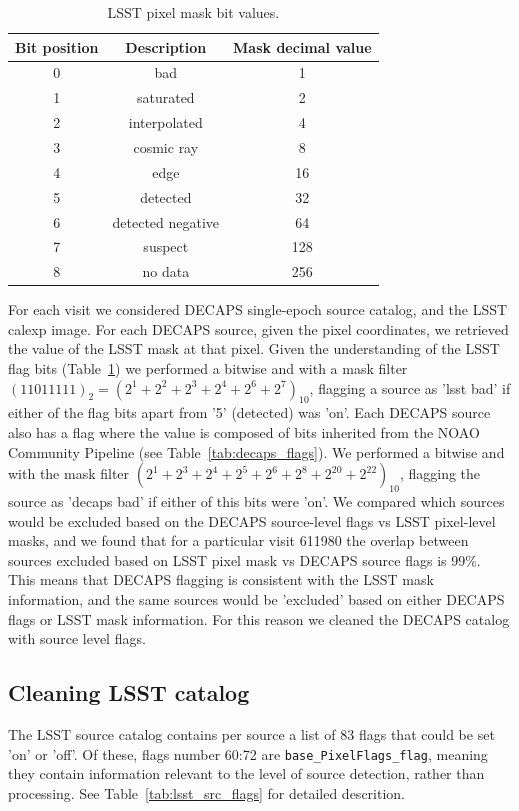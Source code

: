 \documentclass[DM,lsstdraft,toc,usenatbib]{lsstdoc}
\begin{document}
\begin{table}
\centering
\caption{LSST pixel mask bit values.}
\label{tab:lsst_flags}
\begin{tabular}{ ccc} 
\hline
Bit position & Description & Mask decimal value  \\ 
\hline
0  & bad               & 1    \\ 
1  & saturated         & 2   \\ 
2  & interpolated      & 4    \\ 
3  & cosmic ray        & 8    \\ 
4  & edge              & 16    \\ 
5  & detected          & 32   \\ 
6  & detected negative & 64   \\ 
7  & suspect           & 128   \\ 
8  & no data           & 256     \\ 
\hline
\end{tabular}
\end{table}

For each  visit we considered DECAPS single-epoch source catalog, and the LSST calexp image.  For each DECAPS source, given the pixel coordinates, we retrieved the value of the LSST mask at that pixel. Given the understanding of the LSST flag bits (Table~\ref{tab:lsst_flags})  we performed a bitwise and with a mask filter$(11011111)_{2} = (2^{1}+2^{2}+2^{3}+2^{4}+2^{6}+2^{7})_{10}$, flagging a source as 'lsst bad' if either of the flag bits apart from '5' (detected) was 'on'. 
Each DECAPS source  also has a flag where the value is composed of bits inherited from the NOAO Community Pipeline (see Table~\ref{tab:decaps_flags}). We performed a bitwise and with the mask filter $(2^{1}+ 2^{3}+  2^{4}+  2^{5}+  2^{6}+  2^{8}+  2^{20}+  2^{22})_{10}$, flagging the source as 'decaps bad' if either of this bits were 'on'. We compared which sources would be excluded based on the DECAPS source-level flags vs LSST pixel-level masks, and we found that for a particular visit 611980 the overlap between sources excluded based on LSST pixel mask vs DECAPS source flags is 99\%. This means that DECAPS flagging is consistent with the LSST mask information, and the same sources would be 'excluded' based on either DECAPS flags or LSST mask information. 
For this reason we cleaned the DECAPS catalog with  source level flags. 
 
\subsection{Cleaning LSST catalog}
\label{sec:clean_lsst}
The LSST source catalog contains per source a list of 83 flags that could be set 'on' or 'off'. Of these, flags number 60:72 are \verb|base_PixelFlags_flag|, meaning they contain information relevant to the level of source detection, rather than processing. See Table~\ref{tab:lsst_src_flags} for detailed descrition. 
\end{document}
